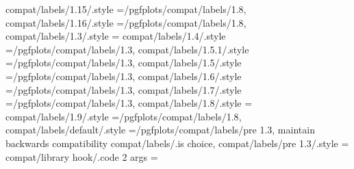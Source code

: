{{{{{{{{{{{{{{{compat/labels/1.15/.style                                          ={/pgfplots/compat/labels/1.8},                                                                                                    
compat/labels/1.16/.style                                          ={/pgfplots/compat/labels/1.8},                                                                                                    
compat/labels/1.3/.style                                           ={                                                                                                                                 
compat/labels/1.4/.style                                           ={/pgfplots/compat/labels/1.3},                                                                                                    
compat/labels/1.5.1/.style                                         ={/pgfplots/compat/labels/1.3},                                                                                                    
compat/labels/1.5/.style                                           ={/pgfplots/compat/labels/1.3},                                                                                                    
compat/labels/1.6/.style                                           ={/pgfplots/compat/labels/1.3},                                                                                                    
compat/labels/1.7/.style                                           ={/pgfplots/compat/labels/1.3},                                                                                                    
compat/labels/1.8/.style                                           ={                                                                                                                                  
compat/labels/1.9/.style                                           ={/pgfplots/compat/labels/1.8},                                                                                                    
compat/labels/default/.style                                       ={/pgfplots/compat/labels/pre 1.3}, maintain backwards compatibility                                                               
compat/labels/.is choice,
compat/labels/pre 1.3/.style                                       ={                                                                                                                                 
compat/library hook/.code 2 args                                   ={                                                                                                                                 
}}}}}}}}}}}}}}}}}}}
